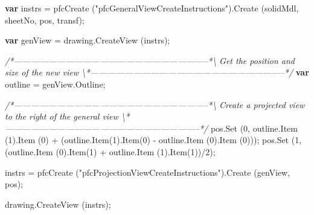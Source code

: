 \documentclass[]{article}
\newenvironment{Shaded}{}{}
\newcommand{\KeywordTok}[1]{\textcolor[rgb]{0.00,0.44,0.13}{\textbf{{#1}}}}
\newcommand{\DecValTok}[1]{\textcolor[rgb]{0.25,0.63,0.44}{{#1}}}
\newcommand{\StringTok}[1]{\textcolor[rgb]{0.25,0.44,0.63}{{#1}}}
\newcommand{\CommentTok}[1]{\textcolor[rgb]{0.38,0.63,0.69}{\textit{{#1}}}}
\newcommand{\OtherTok}[1]{\textcolor[rgb]{0.00,0.44,0.13}{{#1}}}
\newcommand{\FunctionTok}[1]{\textcolor[rgb]{0.02,0.16,0.49}{{#1}}}
\newcommand{\NormalTok}[1]{{#1}}
\begin{document}
\begin{Shaded}
\begin{Highlighting}[]
  \KeywordTok{var} \NormalTok{instrs = }
    \FunctionTok{pfcCreate} \NormalTok{(}\StringTok{"pfcGeneralViewCreateInstructions"}\NormalTok{).}\FunctionTok{Create} \NormalTok{(solidMdl,}
                               \NormalTok{sheetNo, pos, transf);}
  
  \KeywordTok{var} \NormalTok{genView = }\OtherTok{drawing}\NormalTok{.}\FunctionTok{CreateView} \NormalTok{(instrs);}
    
\CommentTok{/*--------------------------------------------------------------------*\textbackslash{}     }
\CommentTok{  Get the position and size of the new view }
\CommentTok{\textbackslash{}*--------------------------------------------------------------------*/} 
  \KeywordTok{var} \NormalTok{outline = }\OtherTok{genView}\NormalTok{.}\FunctionTok{Outline}\NormalTok{;}

\CommentTok{/*--------------------------------------------------------------------*\textbackslash{}     }
\CommentTok{  Create a projected view to the right of the general view }
\CommentTok{\textbackslash{}*--------------------------------------------------------------------*/} 
  \OtherTok{pos}\NormalTok{.}\FunctionTok{Set} \NormalTok{(}\DecValTok{0}\NormalTok{, }\OtherTok{outline}\NormalTok{.}\FunctionTok{Item} \NormalTok{(}\DecValTok{1}\NormalTok{).}\FunctionTok{Item} \NormalTok{(}\DecValTok{0}\NormalTok{) + (}\OtherTok{outline}\NormalTok{.}\FunctionTok{Item}\NormalTok{(}\DecValTok{1}\NormalTok{).}\FunctionTok{Item}\NormalTok{(}\DecValTok{0}\NormalTok{) - }
                       \OtherTok{outline}\NormalTok{.}\FunctionTok{Item} \NormalTok{(}\DecValTok{0}\NormalTok{).}\FunctionTok{Item} \NormalTok{(}\DecValTok{0}\NormalTok{)));}
  \OtherTok{pos}\NormalTok{.}\FunctionTok{Set} \NormalTok{(}\DecValTok{1}\NormalTok{, (}\OtherTok{outline}\NormalTok{.}\FunctionTok{Item} \NormalTok{(}\DecValTok{0}\NormalTok{).}\FunctionTok{Item}\NormalTok{(}\DecValTok{1}\NormalTok{) + }\OtherTok{outline}\NormalTok{.}\FunctionTok{Item} \NormalTok{(}\DecValTok{1}\NormalTok{).}\FunctionTok{Item}\NormalTok{(}\DecValTok{1}\NormalTok{))/}\DecValTok{2}\NormalTok{);}
  
  \NormalTok{instrs = }
    \FunctionTok{pfcCreate} \NormalTok{(}\StringTok{"pfcProjectionViewCreateInstructions"}\NormalTok{).}\FunctionTok{Create} \NormalTok{(genView, }
                                  \NormalTok{pos);}
  
  \OtherTok{drawing}\NormalTok{.}\FunctionTok{CreateView} \NormalTok{(instrs);}
    

\end{Highlighting}
\end{Shaded}
\end{document}
